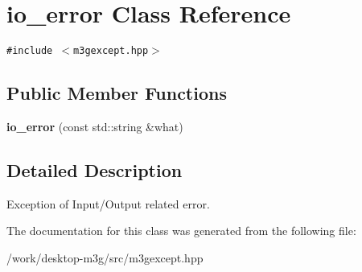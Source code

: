 \hypertarget{classm3g_1_1io__error}{
\section{io\_\-error Class Reference}
\label{classm3g_1_1io__error}
}
{\tt \#include $<$m3gexcept.hpp$>$}

\subsection*{Public Member Functions}
\begin{CompactItemize}
\item 
\hypertarget{classm3g_1_1io__error_89fb3d7ce3f19257f1f68eaf8dd3cc64}{
\textbf{io\_\-error} (const std::string \&what)}
\label{classm3g_1_1io__error_89fb3d7ce3f19257f1f68eaf8dd3cc64}

\end{CompactItemize}


\subsection{Detailed Description}
Exception of Input/Output related error. 

The documentation for this class was generated from the following file:\begin{CompactItemize}
\item 
/work/desktop-m3g/src/m3gexcept.hpp\end{CompactItemize}
